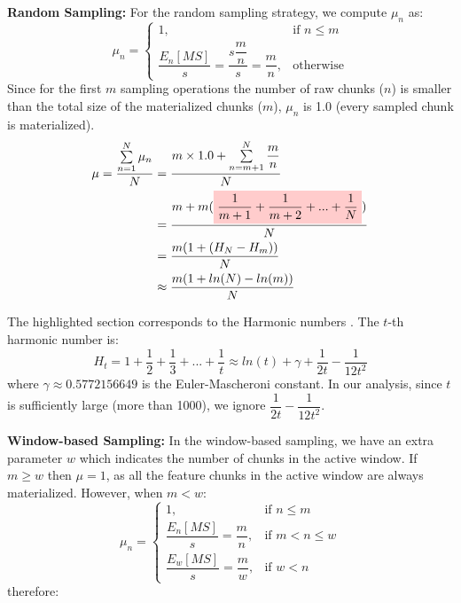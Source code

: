 \textbf{Random Sampling:} 
For the random sampling strategy, we compute $\mu_n$ as:
\begin{equation*}
\mu_n = 
\begin{cases}
    1, 	&\text{if } n \leq m\\
     \dfrac{E_n[MS]}{s} = \dfrac{s\dfrac{m}{n}}{s} = \dfrac{m}{n},   & \text{otherwise}
\end{cases}
\end{equation*}
Since for the first $m$ sampling operations the number of raw chunks ($n$) is smaller than the total size of the materialized chunks ($m$), $\mu_n$ is 1.0 (every sampled chunk is materialized).
\newcommand{\customhighlight}[1]{\colorbox{red!20}{$\displaystyle#1$}}
\begin{equation} \label{formula-uniform}
\begin{aligned}
\mu=\dfrac{\sum\limits_{n=1}^N \mu_n}{N}
&=\dfrac{m \times 1.0 + \sum\limits_{n = m+1}^{N} \dfrac{m}{n}}{N} \\
&=\dfrac{m  +  m (\customhighlight{\dfrac{1}{m+1} +\dfrac{1}{m+2}  + ... + \dfrac{1}{N}}) }{N}\\
&=\dfrac{m(1 + (H_N - H_{m}))}{N}\\
&\approx \dfrac{m( 1+ln(N) - ln(m))}{N}
\end{aligned}
\end{equation}

The highlighted section corresponds to the Harmonic numbers \cite{sun2012arithmetic}.
The $t$-th harmonic number is:
\begin{equation*}
H_t = 1 + \dfrac{1}{2} + \dfrac{1}{3} + ... + \dfrac{1}{t} \approx ln(t) + \gamma + \dfrac{1}{2t} - \dfrac{1}{12t^2}
\end{equation*}
where $\gamma \approx 0.5772156649$ is the Euler-Mascheroni constant.
In our analysis, since $t$ is sufficiently large (more than 1000), we ignore $\dfrac{1}{2t} - \dfrac{1}{12t^2}$.

\textbf{Window-based Sampling:}
In the window-based sampling, we have an extra parameter $w$ which indicates the number of chunks in the active window.
If $m \geq w$ then $\mu=1$, as all the feature chunks in the active window are always materialized.
However, when $m < w$:
\begin{equation*}
\mu_n = 
\begin{cases}
    1, 	&\text{if } n \leq m\\
     \dfrac{E_n[MS]}{s} = \dfrac{m}{n},   &\text{if } m < n \leq w\\
      \dfrac{E_w[MS]}{s} = \dfrac{m}{w},  &\text{if } w < n
\end{cases}
\end{equation*}
therefore: 


